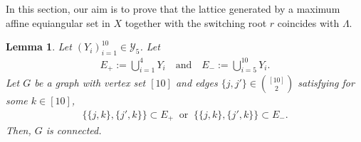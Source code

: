 \documentclass[reqno, 11pt]{amsart}
\numberwithin{equation}{section}
\newtheorem{lem}{Lemma}[section]
\theoremstyle{definition}
\newcommand{\cY}{\mathcal{Y}}
\newcommand{\sr}{ r } %
\begin{document}
In this section, our aim is to prove that the lattice generated by a maximum affine equiangular set in $X$ together with the switching root $\sr$ coincides with $\Lambda$.
\begin{lem}	\label{lem:con}
	Let $(Y_i)_{i=1}^{10} \in \cY_5$.
	Let
	\begin{align}
		E_+ := \bigcup_{i=1}^4 Y_i \quad \text{and} \quad E_- := \bigcup_{i=5}^{10} Y_i.
		\label{lem:con:Epm}
	\end{align}
	Let $G$ be a graph with vertex set $[10]$ and edges $\{j,j'\} \in \binom{[10]}{2}$ satisfying for some $k \in [10]$,
	\begin{align}	\label{lem:con:0}
		\{\{j,k\}, \{j',k\}\} \subset E_+ \ \text{ or }\ \{\{j,k\}, \{j',k\}\} \subset E_-.
	\end{align}
	Then, $G$ is connected.
\end{lem}
\end{document}
